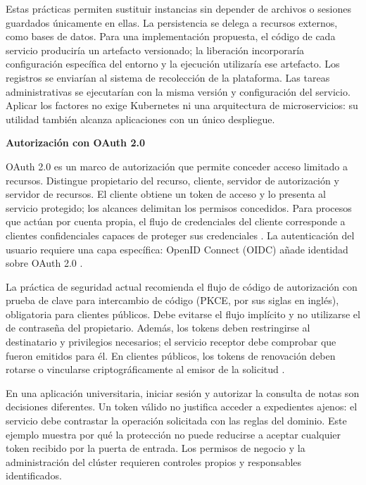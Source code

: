 \documentclass[12pt,letterpaper,onecolumn]{article}
\begin{document}
Estas prácticas permiten sustituir instancias sin depender de archivos o sesiones guardados únicamente en ellas. La persistencia se delega a recursos externos, como bases de datos. Para una implementación propuesta, el código de cada servicio produciría un artefacto versionado; la liberación incorporaría configuración específica del entorno y la ejecución utilizaría ese artefacto. Los registros se enviarían al sistema de recolección de la plataforma. Las tareas administrativas se ejecutarían con la misma versión y configuración del servicio. Aplicar los factores no exige Kubernetes ni una arquitectura de microservicios: su utilidad también alcanza aplicaciones con un único despliegue.

\textbf{Autorización con OAuth 2.0}

OAuth 2.0 es un marco de autorización que permite conceder acceso limitado a recursos. Distingue propietario del recurso, cliente, servidor de autorización y servidor de recursos. El cliente obtiene un token de acceso y lo presenta al servicio protegido; los alcances delimitan los permisos concedidos. Para procesos que actúan por cuenta propia, el flujo de credenciales del cliente corresponde a clientes confidenciales capaces de proteger sus credenciales \parencite{hardtOAuth}. La autenticación del usuario requiere una capa específica: OpenID Connect (OIDC) añade identidad sobre OAuth 2.0 \parencite{sakimuraOpenid}.

La práctica de seguridad actual recomienda el flujo de código de autorización con prueba de clave para intercambio de código (PKCE, por sus siglas en inglés), obligatoria para clientes públicos. Debe evitarse el flujo implícito y no utilizarse el de contraseña del propietario. Además, los tokens deben restringirse al destinatario y privilegios necesarios; el servicio receptor debe comprobar que fueron emitidos para él. En clientes públicos, los tokens de renovación deben rotarse o vincularse criptográficamente al emisor de la solicitud \parencite{lodderstedtSeguridad}.

En una aplicación universitaria, iniciar sesión y autorizar la consulta de notas son decisiones diferentes. Un token válido no justifica acceder a expedientes ajenos: el servicio debe contrastar la operación solicitada con las reglas del dominio. Este ejemplo muestra por qué la protección no puede reducirse a aceptar cualquier token recibido por la puerta de entrada. Los permisos de negocio y la administración del clúster requieren controles propios y responsables identificados.
\end{document}
